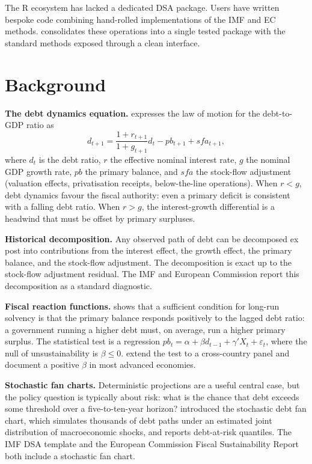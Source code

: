 The R ecosystem has lacked a dedicated DSA package. Users have
written bespoke code combining hand-rolled implementations of the
IMF and EC methods.  consolidates these
operations into a single tested package with the standard methods
exposed through a clean interface.

\section{Background}\label{background}

\textbf{The debt dynamics equation.} \citet{blanchard1990} expresses the law
of motion for the debt-to-GDP ratio as
\[d_{t+1} = \frac{1 + r_{t+1}}{1 + g_{t+1}} d_t - pb_{t+1} + sfa_{t+1},\]
where \(d_t\) is the debt ratio, \(r\) the effective nominal interest
rate, \(g\) the nominal GDP growth rate, \(pb\) the primary balance,
and \(sfa\) the stock-flow adjustment (valuation effects,
privatisation receipts, below-the-line operations). When \(r < g\),
debt dynamics favour the fiscal authority: even a primary deficit
is consistent with a falling debt ratio. When \(r > g\), the
interest-growth differential is a headwind that must be offset by
primary surpluses.

\textbf{Historical decomposition.} Any observed path of debt can be
decomposed ex post into contributions from the interest effect,
the growth effect, the primary balance, and the stock-flow
adjustment. The decomposition is exact up to the stock-flow
adjustment residual. The IMF and European Commission report this
decomposition as a standard diagnostic.

\textbf{Fiscal reaction functions.} \citet{bohn1998} shows that a sufficient
condition for long-run solvency is that the primary balance
responds positively to the lagged debt ratio: a government running
a higher debt must, on average, run a higher primary surplus. The
statistical test is a regression \(pb_t = \alpha + \beta d_{t-1} +
\gamma' X_t + \varepsilon_t\), where the null of unsustainability is
\(\beta \leq 0\). \citet{mendoza2008international} extend the test to a
cross-country panel and document a positive \(\beta\) in most
advanced economies.

\textbf{Stochastic fan charts.} Deterministic projections are a useful
central case, but the policy question is typically about risk:
what is the chance that debt exceeds some threshold over a
five-to-ten-year horizon? \citet{celasun2006primary} introduced the
stochastic debt fan chart, which simulates thousands of debt paths
under an estimated joint distribution of macroeconomic shocks, and
reports debt-at-risk quantiles. The IMF DSA template and the
European Commission Fiscal Sustainability Report both include a
stochastic fan chart.

